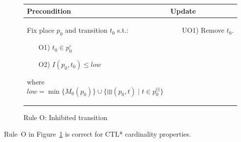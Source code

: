 \begin{figure}[h!]
    \vspace{1cm}

    \begin{adjustbox}{center}
        \begin{tabular}{|p{80mm}|p{45mm}|} \hline
        Precondition & Update \\ \hline
        Fix place $p_0$ and transition $t_0$ s.t.:
        \begin{itemize}[leftmargin=10mm]
            \item[O1)] $t_0\in p_0^\circ$
            \item[O2)] $I(p_0,t_0)\leq low$
        \end{itemize}
        where
        \[
            low=\min\{M_0(p_0)\}\cup\{\boxplus(p_0, t)\mid t\in p_0^\boxminus\}
        \]
        &
        \begin{itemize}[leftmargin=10mm]
            \item[UO1)] Remove $t_0$.
        \end{itemize} \\ \hline
        \end{tabular}
    \end{adjustbox}
    \caption{Rule O: Inhibited transition}
    \label{fig:rule_o}
\end{figure}

\begin{theorem}
    Rule~O in Figure~\ref{fig:rule_o} is correct for CTL* cardinality properties.
\end{theorem}
